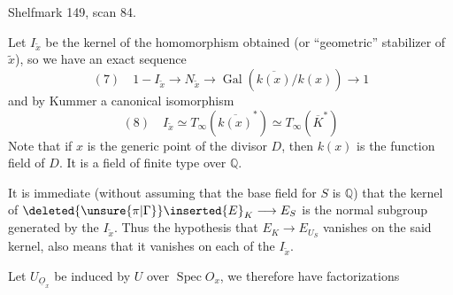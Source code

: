 Shelfmark 149, scan 84.

Let $I_{\widetilde x}$ be the kernel of the homomorphism obtained (or ``geometric'' stabilizer of $\widetilde x$), so we have an exact sequence
\[
(7)\quad 1-I_{\widetilde x}\longrightarrow N_{\widetilde x}\longrightarrow\operatorname{Gal}(\overline{k(x)}/k(x))\longrightarrow1
\]
and by Kummer a canonical isomorphism
\[
(8)\quad I_{\widetilde x}\simeq T_\infty(\overline{k(x)}^*)\simeq T_\infty(\overline K^*)
\]
Note that if $x$ is the generic point of the divisor $D$, then $k(x)$ is the function field of $D$. It is a field of finite type over $\mathbb Q$.

It is immediate (without assuming that the base field for $S$ is $\mathbb Q$) that the kernel of $\deleted{\unsure{\pi|\Gamma}}\inserted{E}_K\longrightarrow E_S$ is the normal subgroup generated by the $I_{\widetilde x}$. Thus the hypothesis that $E_K\longrightarrow E_{U_S}$ vanishes on the said kernel, also means that it vanishes on each of the $I_{\widetilde x}$.

Let  $U_{\underline O_x}$ be induced by $U$ over $\operatorname{Spec}O_x$, we therefore have factorizations
